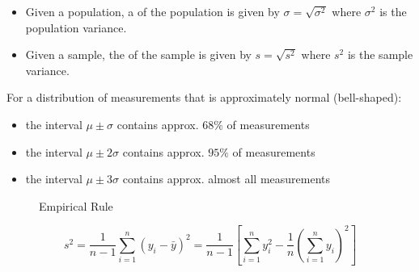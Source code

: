 \begin{nota}
\end{nota}

\begin{defn}
    \begin{itemize}
        \item Given a population, a  of the population is given by $\sigma = \sqrt{\sigma^{2}}$ where $\sigma^{2}$ is the population variance.
        \item Given a sample, the  of the sample is given by $s = \sqrt{s^{2}}$ where $s^{2}$ is the sample variance.
    \end{itemize}
\end{defn}

\begin{nota}
\end{nota}

\begin{note}
    For a distribution of measurements that is approximately normal (bell-shaped):
    \begin{itemize}
        \item the interval $\mu \pm \sigma$ contains approx. $68\%$ of measurements
        \item the interval $\mu \pm 2\sigma$ contains approx. $95\%$ of measurements
        \item the interval $\mu \pm 3\sigma$ contains approx. almost all measurements
    \end{itemize}

    \begin{figure}[h]
        \vspace{-40pt}
        \centering
        
        \vspace{-40pt}
        \caption{Empirical Rule}
        \label{fig:emprule}
    \end{figure}
\end{note}

\begin{lemm}
    $$s^{2} = \frac{1}{n-1} \sum_{i=1}^{n} (y_{i} - \bar{y})^{2} = \frac{1}{n-1} \left[\sum_{i=1}^{n} y_{i}^{2} - \frac{1}{n} \left(\sum_{i=1}^{n} y_{i}\right)^{2}\right]$$
\end{lemm}

